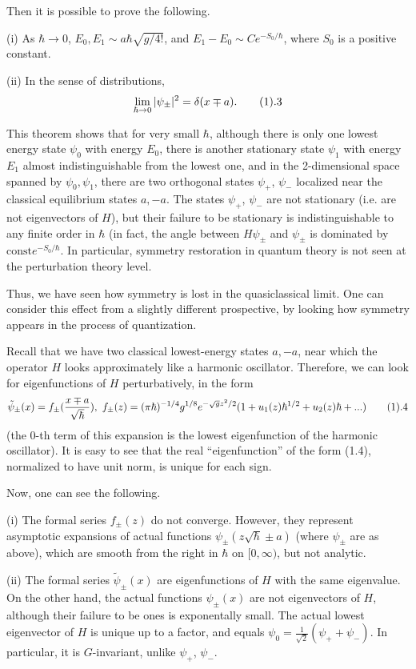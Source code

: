 Then it is possible to prove the following.

(i) As $\hbar\to 0$, $E_0,E_1\sim a\hbar\sqrt{g/4!}$, and 
$E_1-E_0\sim C e^{-S_0/\hbar}$, where $S_0$ is a positive constant. 

(ii) In the sense of distributions, 
$$
\lim_{\hbar\to 0}|\psi_\pm|^2=\delta(x\mp a).\tag 1.3
$$

\endproclaim

This theorem shows that for very small $\hbar$, although there is
only one lowest energy state $\psi_0$ with energy $E_0$, 
there is another stationary state $\psi_1$
with energy $E_1$ almost indistinguishable from the lowest one, 
and in the 2-dimensional space spanned by $\psi_0,\psi_1$, 
there are two orthogonal states $\psi_+$, $\psi_-$ localized near 
the classical equilibrium states $a,-a$. 
The states $\psi_+$, $\psi_-$ are not stationary
(i.e. are not eigenvectors of $H$), but their 
failure to be stationary is indistinguishable to any finite order in $\hbar$
(in fact, the angle between $H\psi_\pm$ and $\psi_\pm$ is dominated by
$\text{const}e^{-S_0/\hbar}$. In particular, symmetry restoration 
in quantum theory is not seen at the perturbation theory level. 

Thus, we have seen how symmetry is lost in the quasiclassical limit. 
One can consider this effect from a slightly different prospective, 
by looking how symmetry appears in the process of quantization.
 
Recall that we have two classical lowest-energy states $a,-a$, near which
the operator $H$ looks approximately like a harmonic oscillator.
Therefore, we can look for eigenfunctions of $H$ perturbatively, in the form
$$
\tilde\psi_\pm(x)=f_\pm(\frac{x\mp a}{\sqrt{\hbar}}),
\ f_\pm(z) =(\pi\hbar)^{-1/4}g^{1/8}
e^{-\sqrt{g}z^2/2}(1+u_1(z)\hbar^{1/2}+u_2(z)\hbar+...)   
\tag 1.4
$$
(the 0-th term of this expansion is the lowest eigenfunction of the harmonic
oscillator). It is easy to see that the 
real ``eigenfunction'' of the form (1.4),
normalized to have unit norm, is 
unique for each sign. 

Now, one can see the following. 

(i) The formal series $f_\pm(z)$ do not converge. However, 
they represent asymptotic expansions of actual functions 
$\psi_\pm(z\sqrt{\hbar}\pm a)$ (where $\psi_\pm$ are as above), which 
are smooth from the right in $\hbar$ on $[0,\infty)$, but not analytic. 

(ii) The formal series $\tilde\psi_\pm(x)$ are eigenfunctions of
$H$ with the same eigenvalue. On the other hand, the actual functions 
$\psi_\pm(x)$ are not eigenvectors of $H$, although their failure to 
be ones is exponentally small. The actual lowest eigenvector of $H$ is 
unique up to a factor, and 
equals $\psi_0=\frac{1}{\sqrt{2}}(\psi_++\psi_-)$. 
In particular, it is $G$-invariant, unlike $\psi_+$, $\psi_-$. 


